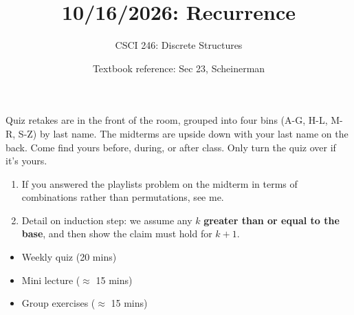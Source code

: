 \documentclass[10pt]{beamer}
\begin{document}




\title{10/16/2026: Recurrence}
\author{CSCI 246: Discrete Structures}
\date{Textbook reference: Sec 23, Scheinerman}

\begin{frame}
    \titlepage 
\end{frame}


\begin{frame}
\begin{mygreenbox}[title=Quiz Retake Pickup]
Quiz retakes are in the front of the room, grouped into four bins (A-G, H-L, M-R, S-Z) by last name. The midterms are upside down with your last name on the back. Come find yours before, during, or after class.  Only turn the quiz over if it's yours.
\end{mygreenbox} 
\vfill 
\begin{myredbox}[title=Announcements]
\begin{enumerate}
	\item If you answered the playlists problem on the midterm in terms of combinations rather than permutations, see me.
	\item Detail on induction step: we assume any $k$ 
	\textbf{greater than or equal to the base}, and then show the claim must hold for $k+1$.
\end{enumerate}
\end{myredbox} 
\vfill 
\begin{myyellowbox}[title=Today's Agenda]
\begin{itemize}
	\item Weekly quiz (20 mins)
	\item Mini lecture ($\approx$ 15 mins)
	\item Group exercises ($\approx$ 15 mins)
\end{itemize}
\end{myyellowbox}
\vfill 

\end{frame}
\end{document}
